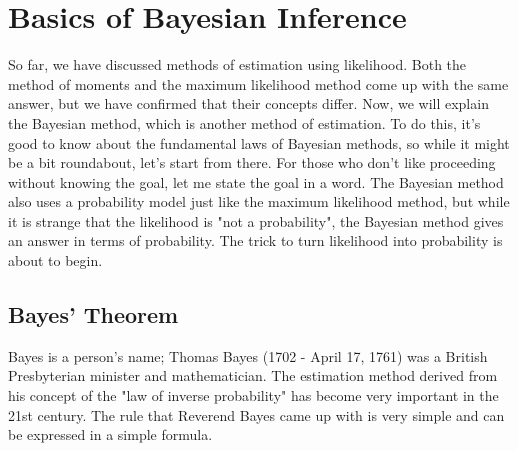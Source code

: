 \documentclass{ltjsbook}
\begin{document}
\chapter{Basics of Bayesian Inference}
\label{m25_bayesian}
So far, we have discussed methods of estimation using likelihood. Both the method of moments and the maximum likelihood method come up with the same answer, but we have confirmed that their concepts differ. Now, we will explain the Bayesian method, which is another method of estimation. To do this, it's good to know about the fundamental laws of Bayesian methods, so while it might be a bit roundabout, let's start from there. For those who don't like proceeding without knowing the goal, let me state the goal in a word. The Bayesian method also uses a probability model just like the maximum likelihood method, but while it is strange that the likelihood is "not a probability", the Bayesian method gives an answer in terms of probability. The trick to turn likelihood into probability is about to begin.

\section{Bayes' Theorem}
Bayes is a person's name; Thomas Bayes (1702 - April 17, 1761) was a British Presbyterian minister and mathematician. The estimation method derived from his concept of the "law of inverse probability" has become very important in the 21st century. The rule that Reverend Bayes came up with is very simple and can be expressed in a simple formula.
\end{document}
